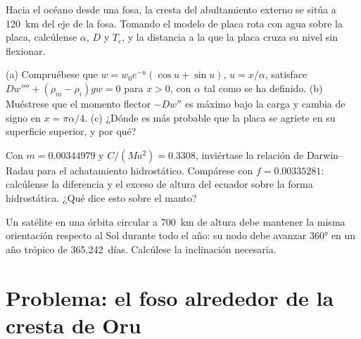 \begin{exercise}[$\star\star$]\label{exo:b3:gravity-geodesy:9}
Hacia el océano desde una fosa, la cresta del abultamiento externo se sitúa a \qty{120}{km} del
eje de la fosa. Tomando el modelo de placa rota con agua sobre la placa, calcúlense
$\alpha$, $D$ y $T_e$, y la distancia a la que la placa cruza su
nivel sin flexionar.
\end{exercise}

\begin{exercise}[$\star\star\star$]\label{exo:b3:gravity-geodesy:10}
(a) Compruébese que $w = w_0e^{-u}(\cos u + \sin u)$, $u = x/\alpha$, satisface
$Dw'''' + (\rho_m - \rho_i)gw = 0$ para $x > 0$, con $\alpha$ tal como se ha definido.
(b) Muéstrese que el momento flector $-Dw''$ es máximo bajo la carga y cambia
de signo en $x = \pi\alpha/4$. (c) ¿Dónde es más probable que la placa se agriete en su
superficie superior, y por qué?
\end{exercise}

\begin{exercise}[$\star\star\star$]\label{exo:b3:gravity-geodesy:11}
Con $m = \num{0.00344979}$ y $C/(Ma^2) = \num{0.3308}$, inviértase la
relación de Darwin--Radau para el achatamiento hidrostático. Compárese con
$f = \num{0.00335281}$: calcúlense la diferencia y el exceso de altura del
ecuador sobre la forma hidrostática. ¿Qué dice esto sobre el manto?
\end{exercise}

\begin{exercise}[$\star\star\star$]\label{exo:b3:gravity-geodesy:12}
Un satélite en una órbita circular a \qty{700}{km} de altura debe mantener la misma
orientación respecto al Sol durante todo el año: su nodo debe avanzar \ang{360} en
un año trópico de \num{365.242}~días. Calcúlese la inclinación necesaria.
\end{exercise}

\section{Problema: el foso alrededor de la cresta de Oru}

